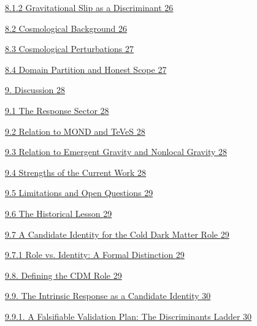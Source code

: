 \documentclass[11pt]{article}
\begin{document}
\hyperref[gravitational-slip-as-a-discriminant]{8.1.2 Gravitational Slip as a Discriminant \hyperref[gravitational-slip-as-a-discriminant]{26}}

\hyperref[cosmological-background]{8.2 Cosmological Background \hyperref[cosmological-background]{26}}

\hyperref[cosmological-perturbations]{8.3 Cosmological Perturbations \hyperref[cosmological-perturbations]{27}}

\hyperref[domain-partition-and-honest-scope]{8.4 Domain Partition and Honest Scope \hyperref[domain-partition-and-honest-scope]{27}}

\hyperref[discussion]{9. Discussion \hyperref[discussion]{28}}

\hyperref[the-response-sector]{9.1 The Response Sector \hyperref[the-response-sector]{28}}

\hyperref[relation-to-mond-and-teves]{9.2 Relation to MOND and TeVeS \hyperref[relation-to-mond-and-teves]{28}}

\hyperref[relation-to-emergent-gravity-and-nonlocal-gravity]{9.3 Relation to Emergent Gravity and Nonlocal Gravity \hyperref[relation-to-emergent-gravity-and-nonlocal-gravity]{28}}

\hyperref[strengths-of-the-current-work]{9.4 Strengths of the Current Work \hyperref[strengths-of-the-current-work]{28}}

\hyperref[limitations-and-open-questions]{9.5 Limitations and Open Questions \hyperref[limitations-and-open-questions]{29}}

\hyperref[the-historical-lesson]{9.6 The Historical Lesson \hyperref[the-historical-lesson]{29}}

\hyperref[a-candidate-identity-for-the-cold-dark-matter-role]{9.7 A Candidate Identity for the Cold Dark Matter Role \hyperref[a-candidate-identity-for-the-cold-dark-matter-role]{29}}

\hyperref[role-vs.-identity-a-formal-distinction]{9.7.1 Role vs. Identity: A Formal Distinction \hyperref[role-vs.-identity-a-formal-distinction]{29}}

\hyperref[defining-the-cdm-role]{9.8. Defining the CDM Role \hyperref[defining-the-cdm-role]{29}}

\hyperref[the-intrinsic-response-as-a-candidate-identity]{9.9. The Intrinsic Response as a Candidate Identity \hyperref[the-intrinsic-response-as-a-candidate-identity]{30}}

\hyperref[a-falsifiable-validation-plan-the-discriminants-ladder]{9.9.1. A Falsifiable Validation Plan: The Discriminants Ladder \hyperref[a-falsifiable-validation-plan-the-discriminants-ladder]{30}}
\end{document}
